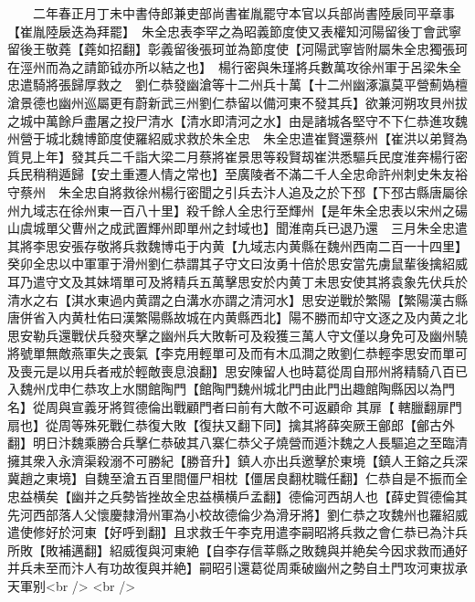 　　二年春正月丁未中書侍郎兼吏部尚書崔胤罷守本官以兵部尚書陸扆同平章事【崔胤陸扆迭為拜罷】　朱全忠表李罕之為昭義節度使又表權知河陽留後丁會武寧留後王敬蕘【蕘如招翻】彰義留後張珂並為節度使【河陽武寧皆附屬朱全忠獨張珂在涇州而為之請節钺亦所以結之也】　楊行密與朱瑾將兵數萬攻徐州軍于呂梁朱全忠遣騎將張歸厚救之　劉仁恭發幽滄等十二州兵十萬【十二州幽涿瀛莫平營薊媯檀滄景德也幽州巡屬更有蔚新武三州劉仁恭留以備河東不發其兵】欲兼河朔攻貝州拔之城中萬餘戶盡屠之投尸清水【清水即清河之水】由是諸城各堅守不下仁恭進攻魏州營于城北魏博節度使羅紹威求救於朱全忠　朱全忠遣崔賢還蔡州【崔洪以弟賢為質見上年】發其兵二千詣大梁二月蔡將崔景思等殺賢刼崔洪悉驅兵民度淮奔楊行密兵民稍稍遁歸【安土重遷人情之常也】至廣陵者不滿二千人全忠命許州刺史朱友裕守蔡州　朱全忠自將救徐州楊行密聞之引兵去汴人追及之於下邳【下邳古縣唐屬徐州九域志在徐州東一百八十里】殺千餘人全忠行至輝州【是年朱全忠表以宋州之碭山虞城單父曹州之成武置輝州即單州之封域也】聞淮南兵已退乃還　三月朱全忠遣其將李思安張存敬將兵救魏博屯于内黄【九域志内黄縣在魏州西南二百一十四里】癸卯全忠以中軍軍于滑州劉仁恭謂其子守文曰汝勇十倍於思安當先虜鼠輩後擒紹威耳乃遣守文及其妹壻單可及將精兵五萬擊思安於内黄丁未思安使其將袁象先伏兵於清水之右【淇水東過内黄謂之白溝水亦謂之清河水】思安逆戰於繁陽【繁陽漢古縣唐併省入内黄杜佑曰漢繁陽縣故城在内黄縣西北】陽不勝而却守文逐之及内黄之北思安勒兵還戰伏兵發夾擊之幽州兵大敗斬可及殺獲三萬人守文僅以身免可及幽州驍將號單無敵燕軍失之喪氣【李克用輕單可及而有木瓜澗之敗劉仁恭輕李思安而單可及喪元是以用兵者戒於輕敵喪息浪翻】思安陳留人也時葛從周自邢州將精騎八百已入魏州戊申仁恭攻上水關館陶門【館陶門魏州城北門由此門出趣館陶縣因以為門名】從周與宣義牙將賀德倫出戰顧門者曰前有大敵不可返顧命其扉【轄臘翻扉門扇也】從周等殊死戰仁恭復大敗【復扶又翻下同】擒其將薛突厥王鄶郎【鄶古外翻】明日汴魏乘勝合兵擊仁恭破其八寨仁恭父子燒營而遁汴魏之人長驅追之至臨清擁其衆入永濟渠殺溺不可勝紀【勝音升】鎮人亦出兵邀擊於東境【鎮人王鎔之兵深冀趙之東境】自魏至滄五百里間僵尸相枕【僵居良翻枕職任翻】仁恭自是不振而全忠益横矣【幽并之兵勢皆挫故全忠益横横戶孟翻】德倫河西胡人也【薛史賀德倫其先河西部落人父懷慶隸滑州軍為小校故德倫少為滑牙將】劉仁恭之攻魏州也羅紹威遣使修好於河東【好呼到翻】且求救壬午李克用遣李嗣昭將兵救之會仁恭已為汴兵所敗【敗補邁翻】紹威復與河東絶【自李存信莘縣之敗魏與并絶矣今因求救而通好并兵未至而汴人有功故復與并絶】嗣昭引還葛從周乘破幽州之勢自土門攻河東拔承天軍别<br />
<br />
